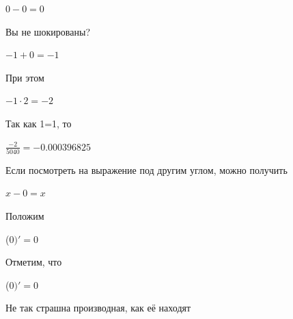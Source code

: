 \documentclass[12pt,a4paper,fleqn]{article}
\begin{document}
\begin{center}
\begin{center}
\begin{center}
\begin{center}
\begin{center}
\begin{center}
\begin{center}
\begin{center}
\begin{center}
\begin{center}
\begin{center}
\begin{center}
\begin{center}
\begin{center}
\begin{center}
\begin{center}
\begin{center}
\begin{center}
\begin{center}
\begin{center}
\begin{center}
\begin{center}
\begin{center}
\begin{center}
\begin{center}
\begin{center}
\begin{center}
\begin{center}
\begin{center}
\begin{center}
\begin{center}
\begin{center}
\begin{center}
\begin{center}
\begin{center}
\begin{center}
\begin{center}
\begin{center}
\begin{center}
\begin{center}
\begin{center}
\begin{center}
\begin{center}
\begin{center}
\begin{center}
\begin{center}
\begin{center}
\begin{center}
\begin{center}
\begin{center}
\begin{center}
\begin{center}
\begin{center}
\begin{center}
\begin{center}
\begin{center}
\begin{center}
\begin{center}
\begin{center}
\begin{center}
\begin{center}
\begin{center}
\begin{center}
\begin{center}
\begin{center}$0-0 = 0$\end{center}
Вы не шокированы?\cite{link3}

\begin{center}
\begin{center}$-1+0 = -1$\end{center}
При этом

\begin{center}
\begin{center}$-1 \cdot 2 = -2$\end{center}
Так как 1=1, то\cite{link4}

\begin{center}
\begin{center}$\frac{-2}{5040} = -0.000396825$\end{center}
Если посмотреть на выражение под другим углом, можно получить

\begin{center}
$x-0 = x$\end{center}
Положим

\begin{center}
 ($0)'
  = 0$\end{center}
Отметим, что

\begin{center}
 ($0)'
  = 0$\end{center}
Не так страшна производная, как её находят\cite{link2}


\end{center}
\end{center}
\end{center}
\end{center}
\end{center}
\end{center}
\end{center}
\end{center}
\end{center}
\end{center}
\end{center}
\end{center}
\end{center}
\end{center}
\end{center}
\end{center}
\end{center}
\end{center}
\end{center}
\end{center}
\end{center}
\end{center}
\end{center}
\end{center}
\end{center}
\end{center}
\end{center}
\end{center}
\end{center}
\end{center}
\end{center}
\end{center}
\end{center}
\end{center}
\end{center}
\end{center}
\end{center}
\end{center}
\end{center}
\end{center}
\end{center}
\end{center}
\end{center}
\end{center}
\end{center}
\end{center}
\end{center}
\end{center}
\end{center}
\end{center}
\end{center}
\end{center}
\end{center}
\end{center}
\end{center}
\end{center}
\end{center}
\end{center}
\end{center}
\end{center}
\end{center}
\end{center}
\end{center}
\end{center}
\end{center}
\end{center}
\end{center}
\end{document}
